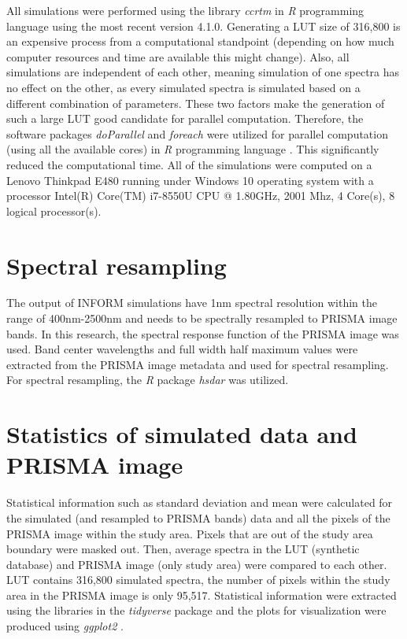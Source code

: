 \documentclass[a4paper, twoside]{templates/ociamthesis}
\begin{document}
All simulations were performed using the library \emph{ccrtm} \citep{ccrtm} in \emph{R} programming language \citep{r} using the most recent version 4.1.0. Generating a LUT size of 316,800 is an expensive process from a computational standpoint (depending on how much computer resources and time are available this might change). Also, all simulations are independent of each other, meaning simulation of one spectra has no effect on the other, as every simulated spectra is simulated based on a different combination of parameters. These two factors make the generation of such a large LUT good candidate for parallel computation. Therefore, the software packages \emph{doParallel} \citep{doparallel} and \emph{foreach} \citep{foreach} were utilized for parallel computation (using all the available cores) in \emph{R} programming language \citep{r}. This significantly reduced the computational time. All of the simulations were computed on a Lenovo Thinkpad E480 running under Windows 10 operating system with a processor Intel(R) Core(TM) i7-8550U CPU @ 1.80GHz, 2001 Mhz, 4 Core(s), 8 logical processor(s).

\hypertarget{spectral-resampling}{%
\section{Spectral resampling}\label{spectral-resampling}}

The output of INFORM simulations have 1nm spectral resolution within the range of 400nm-2500nm and needs to be spectrally resampled to PRISMA image bands. In this research, the spectral response function of the PRISMA image was used. Band center wavelengths and full width half maximum values were extracted from the PRISMA image metadata and used for spectral resampling. For spectral resampling, the \emph{R} package \emph{hsdar} \citep{hsdar} was utilized.

\hypertarget{statistics-of-simulated-data-and-prisma-image}{%
\section{Statistics of simulated data and PRISMA image}\label{statistics-of-simulated-data-and-prisma-image}}

Statistical information such as standard deviation and mean were calculated for the simulated (and resampled to PRISMA bands) data and all the pixels of the PRISMA image within the study area. Pixels that are out of the study area boundary were masked out. Then, average spectra in the LUT (synthetic database) and PRISMA image (only study area) were compared to each other. LUT contains 316,800 simulated spectra, the number of pixels within the study area in the PRISMA image is only 95,517. Statistical information were extracted using the libraries in the \emph{tidyverse} package \citep{tidyverse} and the plots for visualization were produced using \emph{ggplot2} \citep{ggplot2}.
\end{document}
